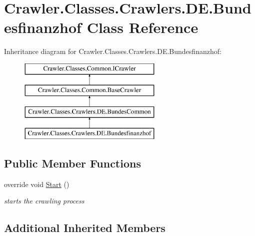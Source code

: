 \hypertarget{class_crawler_1_1_classes_1_1_crawlers_1_1_d_e_1_1_bundesfinanzhof}{\section{Crawler.\-Classes.\-Crawlers.\-D\-E.\-Bundesfinanzhof Class Reference}
\label{class_crawler_1_1_classes_1_1_crawlers_1_1_d_e_1_1_bundesfinanzhof}
}
Inheritance diagram for Crawler.\-Classes.\-Crawlers.\-D\-E.\-Bundesfinanzhof\-:\begin{figure}[H]
\begin{center}
\leavevmode
\includegraphics[height=4.000000cm]{class_crawler_1_1_classes_1_1_crawlers_1_1_d_e_1_1_bundesfinanzhof}
\end{center}
\end{figure}
\subsection*{Public Member Functions}
\begin{DoxyCompactItemize}
\item 
override void \hyperlink{class_crawler_1_1_classes_1_1_crawlers_1_1_d_e_1_1_bundesfinanzhof_ad603e762fc8e22e2c86a027889fbf004}{Start} ()
\begin{DoxyCompactList}\small\item\em starts the crawling process \end{DoxyCompactList}\end{DoxyCompactItemize}
\subsection*{Additional Inherited Members}


